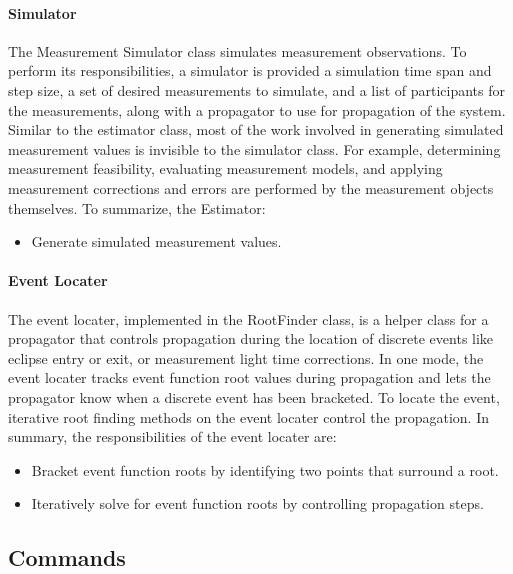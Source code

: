 \paragraph{Simulator}  The Measurement Simulator class simulates measurement observations.  To
perform its responsibilities, a simulator is provided a simulation time span and step size, a set of
desired measurements to simulate, and a list of participants for the measurements, along with a
propagator to use for propagation of the system.  Similar to the estimator class, most of the work
involved in generating simulated measurement values is invisible to the simulator class.  For
example, determining measurement feasibility, evaluating measurement models, and applying
measurement corrections and errors are performed by the measurement objects themselves.  To
summarize, the Estimator:
\begin{itemize}
\item Generate simulated measurement values.
\end{itemize}

\paragraph{Event Locater}  The event locater, implemented in the RootFinder class, is a helper class
for a propagator that controls propagation during the location of discrete events like eclipse
entry or exit, or measurement light time corrections.  In one mode, the event locater tracks event
function root values during propagation and lets the propagator know when a discrete event has been
bracketed.  To locate the event, iterative root finding methods on the event locater control the
propagation.  In summary, the responsibilities of the event locater are:
\begin{itemize}
\item Bracket event function roots by identifying two points that surround a root.
\item Iteratively solve for event function roots by controlling propagation steps.
\end{itemize}

\subsection{Commands}


